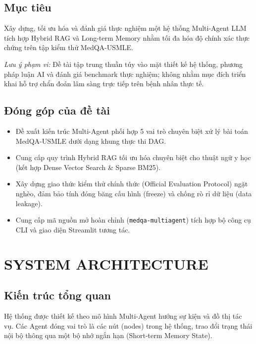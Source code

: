 \subsection{Mục tiêu}
Xây dựng, tối ưu hóa và đánh giá thực nghiệm một hệ thống Multi-Agent LLM tích hợp Hybrid RAG và Long-term Memory nhằm tối đa hóa độ chính xác thực chứng trên tập kiểm thử MedQA-USMLE.

\textit{Lưu ý phạm vi:} Đề tài tập trung thuần túy vào mặt thiết kế hệ thống, phương pháp luận AI và đánh giá benchmark thực nghiệm; không nhằm mục đích triển khai hỗ trợ chẩn đoán lâm sàng trực tiếp trên bệnh nhân thực tế.

\subsection{Đóng góp của đề tài}
\begin{itemize}
    \item Đề xuất kiến trúc Multi-Agent phối hợp 5 vai trò chuyên biệt xử lý bài toán MedQA-USMLE dưới dạng khung thực thi DAG.
    \item Cung cấp quy trình Hybrid RAG tối ưu hóa chuyên biệt cho thuật ngữ y học (kết hợp Dense Vector Search \& Sparse BM25).
    \item Xây dựng giao thức kiểm thử chính thức (Official Evaluation Protocol) ngặt nghèo, đảm bảo tính đóng băng cấu hình (freeze) và chống rò rỉ dữ liệu (data leakage).
    \item Cung cấp mã nguồn mở hoàn chỉnh (\texttt{medqa-multiagent}) tích hợp bộ công cụ CLI và giao diện Streamlit tương tác.
\end{itemize}

\section{SYSTEM ARCHITECTURE}

\subsection{Kiến trúc tổng quan}
Hệ thống được thiết kế theo mô hình Multi-Agent hướng sự kiện và đồ thị tác vụ. Các Agent đóng vai trò là các nút (nodes) trong hệ thống, trao đổi trạng thái nội bộ thông qua một bộ nhớ ngắn hạn (Short-term Memory State).



